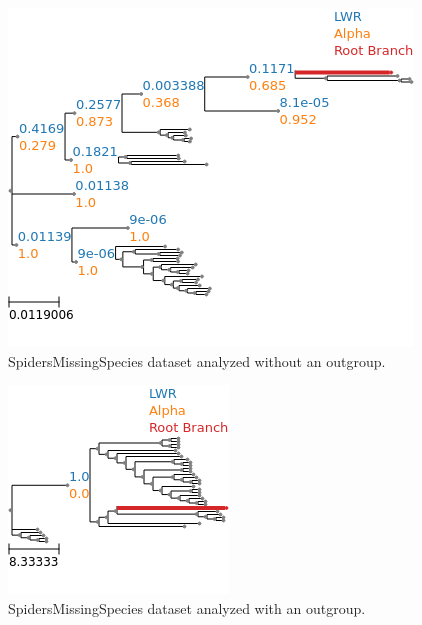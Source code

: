 \documentclass{article}
\begin{document}
%    

\begin{figure}
  \begin{center}
    \includegraphics[width=.75\linewidth]{
    ./figs/spiders/missing_species_no_outgroup.png}
    \caption{SpidersMissingSpecies dataset analyzed without an outgroup.}
    \label{fig:spiders-missing-species-no-outgroup}
  \end{center}
\end{figure}

\begin{figure}
  \begin{center}
    \includegraphics[width=.75\linewidth]{
    ./figs/spiders/missing_species_with_outgroup.png}
    \caption{SpidersMissingSpecies dataset analyzed with an outgroup.}
    \label{fig:spiders-missing-species-outgroup}
  \end{center}
\end{figure}
\end{document}

